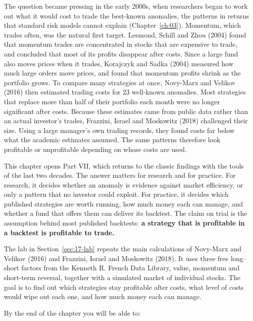 The question became pressing in the early 2000s, when researchers began to work out what it would cost to trade the best-known anomalies, the patterns in returns that standard risk models cannot explain (Chapter~\ref{ch:03}). Momentum, which trades often, was the natural first target. Lesmond, Schill and Zhou (2004) found that momentum trades are concentrated in stocks that are expensive to trade, and concluded that most of its profits disappear after costs. Since a large fund also moves prices when it trades, Korajczyk and Sadka (2004) measured how much large orders move prices, and found that momentum profits shrink as the portfolio grows. To compare many strategies at once, Novy-Marx and Velikov (2016) then estimated trading costs for 23 well-known anomalies. Most strategies that replace more than half of their portfolio each month were no longer significant after costs. Because these estimates came from public data rather than an actual investor's trades, Frazzini, Israel and Moskowitz (2018) challenged their size. Using a large manager's own trading records, they found costs far below what the academic estimates assumed. The same patterns therefore look profitable or unprofitable depending on whose costs are used.

This chapter opens Part VII, which returns to the classic findings with the tools of the last two decades. The answer matters for research and for practice. For research, it decides whether an anomaly is evidence against market efficiency, or only a pattern that no investor could exploit. For practice, it decides which published strategies are worth running, how much money each can manage, and whether a fund that offers them can deliver its backtest. The claim on trial is the assumption behind most published backtests: \textbf{a strategy that is profitable in a backtest is profitable to trade.}

The lab in Section~\ref{sec:17-lab} repeats the main calculations of Novy-Marx and Velikov (2016) and Frazzini, Israel and Moskowitz (2018). It uses three free long--short factors from the Kenneth R. French Data Library, value, momentum and short-term reversal, together with a simulated market of individual stocks. The goal is to find out which strategies stay profitable after costs, what level of costs would wipe out each one, and how much money each can manage.

By the end of the chapter you will be able to:

